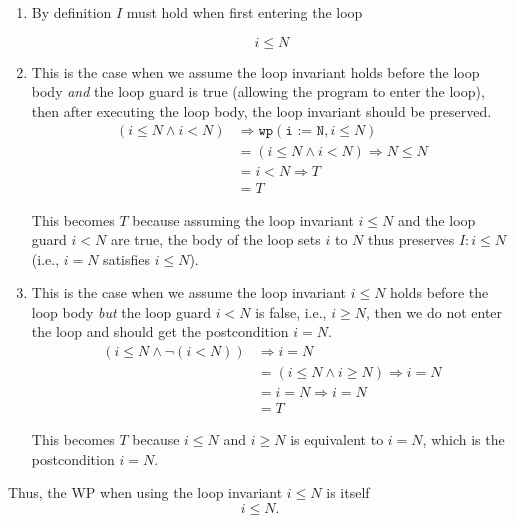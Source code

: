 \documentclass[oneside,11pt,dvipsnames]{book}
\renewcommand{\implies}{\Rightarrow}
\newcommand{\code}[1]{\texttt{#1}}
\begin{document}
\begin{enumerate}
    \item By definition $I$ must hold when first entering the loop

        \[i \le N\]

    \item This is the case when we assume the loop invariant holds before the loop body \emph{and} the loop guard is true (allowing the program to enter the loop), then after executing the loop body, the loop invariant should be preserved.
    \begin{equation*}
        \begin{split}
            (i \le N \land  i < N) &\implies \code{wp}(\code{i := N}, i \le N)\\
            &= (i \le N \land  i < N) \implies  N \le N\\
            &= i < N \implies  T\\
            &= T
        \end{split}
    \end{equation*}

    This becomes $T$ because assuming the loop invariant $i \le N$ and the loop guard $i < N$ are true, the body of the loop sets $i$ to $N$ thus preserves $I: i \le N$ (i.e., $i = N$ satisfies $i \le N$).

    \item  This is the case when we assume the loop invariant $i \le N$ holds before the loop body  \emph{but} the loop guard $i < N$ is false, i.e., $i \ge N$, then we do not enter the loop and should get the postcondition $i = N$.
    \begin{equation*}
        \begin{split}
            (i \le N \land \neg(i < N)) &\implies i = N\\
            &= (i \le N  \land i \ge N)  \implies i = N\\
            &=     i = N   \implies  i = N\\
            &=          T
        \end{split}
    \end{equation*}

    This becomes $T$ because $i \le N$ and $i \ge N$ is equivalent to $i = N$, which is the postcondition $i = N$.

\end{enumerate}

Thus, the WP when using the loop invariant $i \le N$ is itself 
\[ i \le N .\] 
\end{document}
